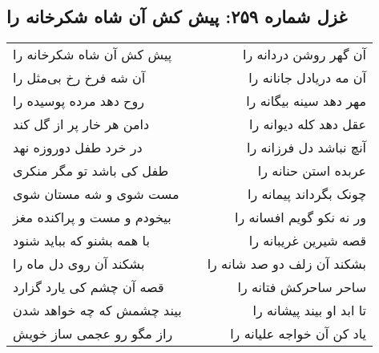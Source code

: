 \begin{center}
\section*{غزل شماره ۲۵۹: پیش کش آن شاه شکرخانه را}
\label{sec:0259}
\begin{longtable}{l p{0.5cm} r}
پیش کش آن شاه شکرخانه را
&&
آن گهر روشن دردانه را
\\
آن شه فرخ رخ بی‌مثل را
&&
آن مه دریادل جانانه را
\\
روح دهد مرده پوسیده را
&&
مهر دهد سینه بیگانه را
\\
دامن هر خار پر از گل کند
&&
عقل دهد کله دیوانه را
\\
در خرد طفل دوروزه نهد
&&
آنچ نباشد دل فرزانه را
\\
طفل کی باشد تو مگر منکری
&&
عربده استن حنانه را
\\
مست شوی و شه مستان شوی
&&
چونک بگرداند پیمانه را
\\
بیخودم و مست و پراکنده مغز
&&
ور نه نکو گویم افسانه را
\\
با همه بشنو که بباید شنود
&&
قصه شیرین غریبانه را
\\
بشکند آن روی دل ماه را
&&
بشکند آن زلف دو صد شانه را
\\
قصه آن چشم کی یارد گزارد
&&
ساحر ساحرکش فتانه را
\\
بیند چشمش که چه خواهد شدن
&&
تا ابد او بیند پیشانه را
\\
راز مگو رو عجمی ساز خویش
&&
یاد کن آن خواجه علیانه را
\\
\end{longtable}
\end{center}
